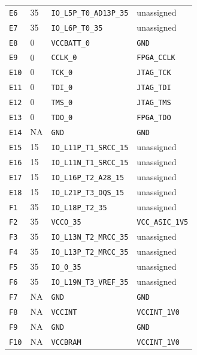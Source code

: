 \documentclass[11pt,a4paper]{article}
\begin{document}
\begin{longtable}{@{}P{13mm}P{13mm}P{78mm}P{62mm}@{}}
\nolinkurl{E6} & 35 & \nolinkurl{IO_L5P_T0_AD13P_35} & \textcolor{muted}{unassigned} \\
\nolinkurl{E7} & 35 & \nolinkurl{IO_L6P_T0_35} & \textcolor{muted}{unassigned} \\
\nolinkurl{E8} & 0 & \nolinkurl{VCCBATT_0} & \nolinkurl{GND} \\
\nolinkurl{E9} & 0 & \nolinkurl{CCLK_0} & \nolinkurl{FPGA_CCLK} \\
\nolinkurl{E10} & 0 & \nolinkurl{TCK_0} & \nolinkurl{JTAG_TCK} \\
\nolinkurl{E11} & 0 & \nolinkurl{TDI_0} & \nolinkurl{JTAG_TDI} \\
\nolinkurl{E12} & 0 & \nolinkurl{TMS_0} & \nolinkurl{JTAG_TMS} \\
\nolinkurl{E13} & 0 & \nolinkurl{TDO_0} & \nolinkurl{FPGA_TDO} \\
\nolinkurl{E14} & NA & \nolinkurl{GND} & \nolinkurl{GND} \\
\nolinkurl{E15} & 15 & \nolinkurl{IO_L11P_T1_SRCC_15} & \textcolor{muted}{unassigned} \\
\nolinkurl{E16} & 15 & \nolinkurl{IO_L11N_T1_SRCC_15} & \textcolor{muted}{unassigned} \\
\nolinkurl{E17} & 15 & \nolinkurl{IO_L16P_T2_A28_15} & \textcolor{muted}{unassigned} \\
\nolinkurl{E18} & 15 & \nolinkurl{IO_L21P_T3_DQS_15} & \textcolor{muted}{unassigned} \\
\nolinkurl{F1} & 35 & \nolinkurl{IO_L18P_T2_35} & \textcolor{muted}{unassigned} \\
\nolinkurl{F2} & 35 & \nolinkurl{VCCO_35} & \nolinkurl{VCC_ASIC_1V5} \\
\nolinkurl{F3} & 35 & \nolinkurl{IO_L13N_T2_MRCC_35} & \textcolor{muted}{unassigned} \\
\nolinkurl{F4} & 35 & \nolinkurl{IO_L13P_T2_MRCC_35} & \textcolor{muted}{unassigned} \\
\nolinkurl{F5} & 35 & \nolinkurl{IO_0_35} & \textcolor{muted}{unassigned} \\
\nolinkurl{F6} & 35 & \nolinkurl{IO_L19N_T3_VREF_35} & \textcolor{muted}{unassigned} \\
\nolinkurl{F7} & NA & \nolinkurl{GND} & \nolinkurl{GND} \\
\nolinkurl{F8} & NA & \nolinkurl{VCCINT} & \nolinkurl{VCCINT_1V0} \\
\nolinkurl{F9} & NA & \nolinkurl{GND} & \nolinkurl{GND} \\
\nolinkurl{F10} & NA & \nolinkurl{VCCBRAM} & \nolinkurl{VCCINT_1V0} \\

\end{longtable}
\end{document}
